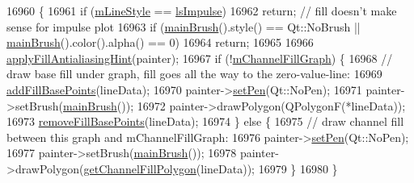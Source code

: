 \begin{DoxyCode}
16960                                                                              \{
16961   \textcolor{keywordflow}{if} (\hyperlink{class_q_c_p_graph_a8604fd98402035a63375849f7341ee25}{mLineStyle} == \hyperlink{class_q_c_p_graph_ad60175cd9b5cac937c5ee685c32c0859aa3b358b4ae7cca94aceeb8e529c12ebb}{lsImpulse})
16962     \textcolor{keywordflow}{return}; \textcolor{comment}{// fill doesn't make sense for impulse plot}
16963   \textcolor{keywordflow}{if} (\hyperlink{class_q_c_p_abstract_plottable_ae74c123832da180c17e22203e748d9b7}{mainBrush}().style() == Qt::NoBrush || \hyperlink{class_q_c_p_abstract_plottable_ae74c123832da180c17e22203e748d9b7}{mainBrush}().color().alpha() == 0)
16964     \textcolor{keywordflow}{return};
16965 
16966   \hyperlink{class_q_c_p_abstract_plottable_ac08a480155895e674dbfe5a5670e0ff3}{applyFillAntialiasingHint}(painter);
16967   \textcolor{keywordflow}{if} (!\hyperlink{class_q_c_p_graph_a2f1777c7accf8244fc640c33f0b04577}{mChannelFillGraph}) \{
16968     \textcolor{comment}{// draw base fill under graph, fill goes all the way to the zero-value-line:}
16969     \hyperlink{class_q_c_p_graph_a5fa7884620d7c54b81dfbd255d97b636}{addFillBasePoints}(lineData);
16970     painter->\hyperlink{class_q_c_p_painter_af9c7a4cd1791403901f8c5b82a150195}{setPen}(Qt::NoPen);
16971     painter->setBrush(\hyperlink{class_q_c_p_abstract_plottable_ae74c123832da180c17e22203e748d9b7}{mainBrush}());
16972     painter->drawPolygon(QPolygonF(*lineData));
16973     \hyperlink{class_q_c_p_graph_ad31b49a90e91e538fd9caf011c913a68}{removeFillBasePoints}(lineData);
16974   \} \textcolor{keywordflow}{else} \{
16975     \textcolor{comment}{// draw channel fill between this graph and mChannelFillGraph:}
16976     painter->\hyperlink{class_q_c_p_painter_af9c7a4cd1791403901f8c5b82a150195}{setPen}(Qt::NoPen);
16977     painter->setBrush(\hyperlink{class_q_c_p_abstract_plottable_ae74c123832da180c17e22203e748d9b7}{mainBrush}());
16978     painter->drawPolygon(\hyperlink{class_q_c_p_graph_a0374b7268e35cab9802a6be2b5d726d7}{getChannelFillPolygon}(lineData));
16979   \}
16980 \}
\end{DoxyCode}


